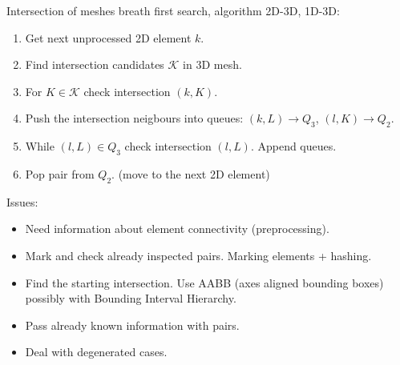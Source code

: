 \documentclass[10pt]{beamer} %
\def\to{\rightarrow}
\begin{document}
\begin{frame}{Intersection of meshes}
  breath first search, algorithm 2D-3D, 1D-3D:
  \begin{enumerate}
    \item Get next unprocessed 2D element $k$.
    \item Find intersection candidates $\mathcal K$ in 3D mesh.
    \item For $K\in \mathcal K$ check intersection $(k, K)$.  
    \item Push the intersection neigbours into queues: $(k, L) \to Q_3$, $(l, K) \to Q_2$. 
    \item While $(l, L) \in Q_3$ check intersection $(l, L)$. Append queues.
    \item Pop pair from $Q_2$. (move to the next 2D element)
  \end{enumerate}

  \vspace{2ex}
  Issues:
  \begin{itemize}
   \item Need information about element connectivity (preprocessing).
   \item Mark and check already inspected pairs. Marking elements + hashing.
   \item Find the starting intersection. Use AABB (axes aligned bounding boxes) possibly with Bounding Interval Hierarchy. 
   \item Pass already known information with pairs.
   \item Deal with degenerated cases.
  \end{itemize}
\end{frame}
\end{document}

